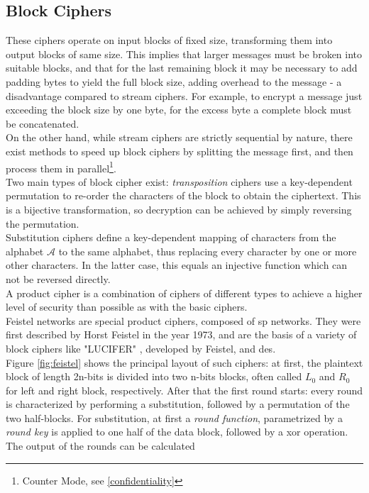 \subsection{Block Ciphers}
These ciphers operate on input blocks of fixed size, transforming them into output blocks of same size. This implies that larger messages must be broken into
suitable blocks, and that for the last remaining block it may be necessary to add padding bytes to yield the full block size,
adding overhead to the message - a disadvantage compared to stream ciphers. For example, to encrypt a message just exceeding the block size by one byte,
for the excess byte a complete block must be concatenated. 
\\
On the other hand, while stream ciphers are strictly sequential by nature, there exist methods to speed up block ciphers by splitting the message
first, and then process them in parallel\footnote{Counter Mode, see \ref{confidentiality}}. 
\\
Two main types of block cipher exist: \textit{transposition} ciphers use a key-dependent permutation to re-order the characters of the block to obtain the ciphertext.
This is a bijective transformation, so decryption can be achieved by simply reversing the permutation.
\\
Substitution ciphers define a key-dependent mapping of characters from the alphabet $\mathcal{A}$ to the same alphabet, thus replacing every character by one
or more other characters. In the latter case, this equals an injective function which can not be reversed directly.
\\
A product cipher is a combination of ciphers of different types to achieve a higher level of security than possible as with the basic ciphers. 
\\
Feistel networks are special product ciphers, composed of \gls{sp} networks. They were first described by Horst Feistel in the year 1973\cite{feistel}, and are 
the basis of a variety of block ciphers like "LUCIFER" \cite{feistel1974block,}, developed by Feistel, and \gls{des}.
\\
Figure \ref{fig:feistel} shows the principal layout of such ciphers: at first, the plaintext block of length
2n-bits is divided into two n-bits blocks, often called $L_0$ and $R_0$ for left and right block, respectively. After that the first round starts: every round
is characterized by performing a substitution, followed by a permutation of the two half-blocks. For substitution, at first a \textit{round function},
parametrized by a \textit{round key} is applied to one half of the data block, followed by a \gls{xor} operation. The output of the rounds can be calculated

